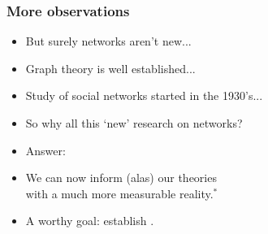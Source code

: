 
\begin{frame}
  \frametitle{More observations}

  \begin{block}{}
  \begin{itemize}
  \item<1->
    But surely \alert{networks aren't new}...
  \item<2->
    Graph theory is well established...
  \item<3->
    Study of social networks started in the 1930's...
  \item<4->
    So why all this `new' research on networks?
  \item<5->
    \alert{Answer:} 
  \item<6->
    We can now inform (alas) our theories \\
    with a much more measurable reality.$^\ast$
  \item<7-> 
    A worthy goal: establish .\\
    \medskip
  \end{itemize}
  \end{block}



\end{frame}

